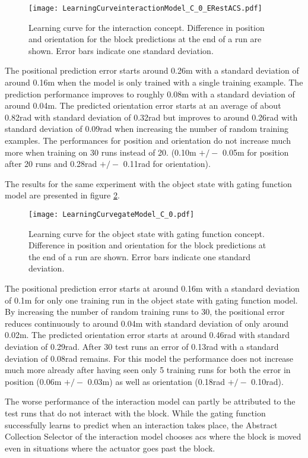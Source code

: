 \begin{figure}[h]
\centering
\texttt{[image: LearningCurveinteractionModel\_C\_0\_ERestACS.pdf]}
\caption{Learning curve for the interaction concept. Difference in position and orientation for the block predictions at the end of a run are shown. Error bars indicate one standard deviation.}
\label{fig:learnCurveInteraction}
\end{figure}

The positional prediction error starts around 0.26m with a standard deviation of around 0.16m when the model is only trained with a single training example. The prediction performance improves to roughly 0.08m with a standard deviation of around 0.04m.
The predicted orientation error starts at an average of about 0.82rad with standard deviation of 0.32rad but improves to around 0.26rad with standard deviation of 0.09rad when increasing the number of random training examples.
The performances for position and orientation do not increase much more when training on 30 runs instead of 20. (0.10m $+/-$ 0.05m for position after 20 runs and 0.28rad $+/-$ 0.11rad for orientation).

The results for the same experiment with the object state with gating function model are presented in figure \ref{fig:learnCurveGate}.

\begin{figure}[h]
\centering
\texttt{[image: LearningCurvegateModel\_C\_0.pdf]}
\caption{Learning curve for the object state with gating function concept. Difference in position and orientation for the block predictions at the end of a run are shown. Error bars indicate one standard deviation.}
\label{fig:learnCurveGate}
\end{figure}

The positional prediction error starts at around 0.16m with a standard deviation of 0.1m for only one training run in the object state with gating function model. By increasing the number of random training runs to 30, the positional error reduces continuously to around 0.04m with standard deviation of only around 0.02m.
The predicted orientation error starts at around 0.46rad with standard deviation of 0.29rad.
After 30 test runs an error of 0.13rad with a standard deviation of 0.08rad remains.
For this model the performance does not increase much more already after having seen only 5 training runs for both the error in position (0.06m $+/-$ 0.03m) as well as orientation (0.18rad $+/-$ 0.10rad).

The worse performance of the interaction model can partly be attributed to the test runs that do not interact with the block. While the gating function successfully learns to predict when an interaction takes place, the Abstract Collection Selector of the interaction model chooses \glspl{ac} where the block is moved even in situations where the actuator goes past the block.

